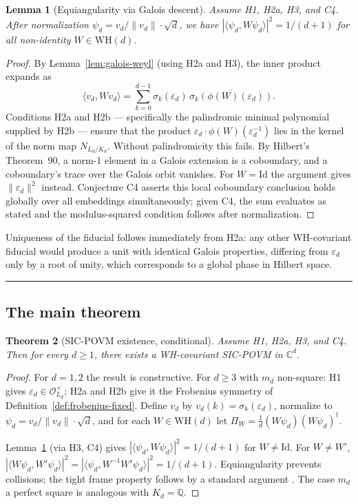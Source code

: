 \documentclass[12pt]{article}
\theoremstyle{plain}
\newtheorem{theoreminner}{Theorem}[section]
\newtheorem{lemmainner}[theoreminner]{Lemma}
\theoremstyle{definition}
\theoremstyle{remark}
\newenvironment{theorem}{\begin{mdframed}[style=thmstyle]\begin{theoreminner}}{\end{theoreminner}\end{mdframed}}
\newenvironment{lemma}{\begin{mdframed}[style=thmstyle]\begin{lemmainner}}{\end{lemmainner}\end{mdframed}}
\newcommand{\WH}{\mathrm{WH}}
\newcommand{\OO}{\mathcal{O}}
\newcommand{\eps}{\varepsilon}
\newcommand{\bQ}{\mathbb{Q}}
\newcommand{\bC}{\mathbb{C}}
\begin{document}
\begin{lemma}[Equiangularity via Galois descent]
  \label{lem:equiangular}
  Assume H1, H2a, H3, and C4. After normalization $\psi_d = v_d / \|v_d\| \cdot \sqrt{d}$, we have $|\langle \psi_d, W\psi_d \rangle|^2 = 1/(d+1)$ for all non-identity $W \in \WH(d)$.
\end{lemma}

\begin{proof}
  By Lemma~\ref{lem:galois-weyl} (using H2a and H3), the inner product expands as
  \[
    \langle v_d, W v_d \rangle = \sum_{k=0}^{d-1} \sigma_k(\eps_d)\, \overline{\sigma_k(\phi(W)(\eps_d))}.
  \]
  Conditions H2a and H2b — specifically the palindromic minimal polynomial supplied by H2b — ensure that the product $\eps_d \cdot \phi(W)(\eps_d^{-1})$ lies in the kernel of the norm map $N_{L_d/K_d}$. Without palindromicity this fails. By Hilbert's Theorem~90, a norm-1 element in a Galois extension is a coboundary, and a coboundary's trace over the Galois orbit vanishes. For $W = \mathrm{Id}$ the argument gives $\|\eps_d\|^2$ instead. Conjecture C4 asserts this local coboundary conclusion holds globally over all embeddings simultaneously; given C4, the sum evaluates as stated and the modulus-squared condition follows after normalization.
\end{proof}

Uniqueness of the fiducial follows immediately from H2a: any other WH-covariant fiducial would produce a unit with identical Galois properties, differing from $\eps_d$ only by a root of unity, which corresponds to a global phase in Hilbert space.

\medskip\noindent\rule{\linewidth}{0.3pt}\medskip

\subsection{The main theorem}

\begin{theorem}[SIC-POVM existence, conditional]
  \label{thm:sic-existence}
  Assume H1, H2a, H3, and C4. Then for every $d \geq 1$, there exists a WH-covariant SIC-POVM in $\bC^d$.
\end{theorem}

\begin{proof}
  For $d = 1, 2$ the result is constructive. For $d \geq 3$ with $m_d$ non-square: H1 gives $\eps_d \in \OO_{L_d}^\times$; H2a and H2b give it the Frobenius symmetry of Definition~\ref{def:frobenius-fixed}. Define $v_d$ by $v_d(k) = \sigma_k(\eps_d)$, normalize to $\psi_d = v_d/\|v_d\| \cdot \sqrt{d}$, and for each $W \in \WH(d)$ let $\Pi_W = \frac{1}{d}(W\psi_d)(W\psi_d)^\dagger$.

  Lemma~\ref{lem:equiangular} (via H3, C4) gives $|\langle \psi_d, W\psi_d\rangle|^2 = 1/(d+1)$ for $W \neq \mathrm{Id}$. For $W \neq W'$, $|\langle W\psi_d, W'\psi_d\rangle|^2 = |\langle \psi_d, W^{-1}W'\psi_d\rangle|^2 = 1/(d+1)$. Equiangularity prevents collisions; the tight frame property follows by a standard argument \cite{appleby2022}. The case $m_d$ a perfect square is analogous with $K_d = \bQ$.
\end{proof}
\end{document}
